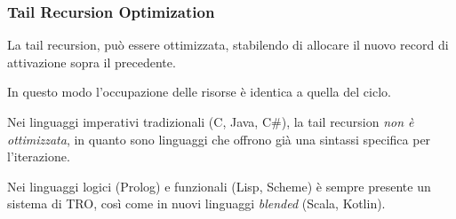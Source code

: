 \subsubsection{Tail Recursion Optimization}
La tail recursion, può essere ottimizzata, stabilendo di allocare il nuovo record di attivazione sopra il precedente.

In questo modo l'occupazione delle risorse è identica a quella del ciclo.

Nei linguaggi imperativi tradizionali (C, Java, C#), la tail recursion \textit{non è ottimizzata}, in quanto sono linguaggi che offrono già una sintassi specifica per l'iterazione.

Nei linguaggi logici (Prolog) e funzionali (Lisp, Scheme) è sempre presente un sistema di TRO, così come in nuovi linguaggi \textit{blended} (Scala, Kotlin).










































